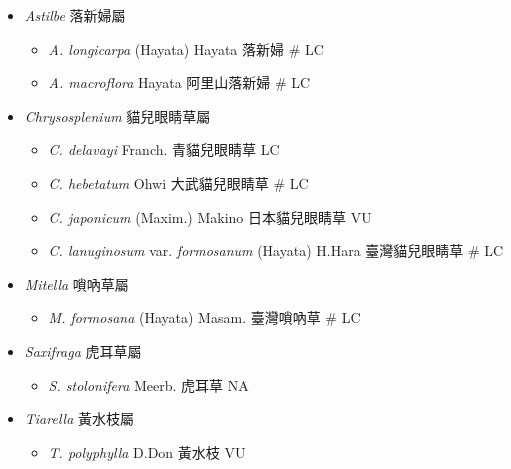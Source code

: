 
  \begin{itemize}
 \item[] \textit{Astilbe} 落新婦屬
                                
  \begin{itemize}
        \item[] \textit{A. longicarpa} (Hayata) Hayata  落新婦  \# LC
        \item[] \textit{A. macroflora} Hayata  阿里山落新婦  \# LC
  \end{itemize}
 \item[] \textit{Chrysosplenium} 貓兒眼睛草屬
                                
  \begin{itemize}
        \item[] \textit{C. delavayi} Franch.  青貓兒眼睛草   LC
        \item[] \textit{C. hebetatum} Ohwi  大武貓兒眼睛草  \# LC
        \item[] \textit{C. japonicum} (Maxim.) Makino  日本貓兒眼睛草   VU
        \item[] \textit{C. lanuginosum} var. \textit{formosanum} (Hayata) H.Hara  臺灣貓兒眼睛草  \# LC
  \end{itemize}
 \item[] \textit{Mitella} 嗩吶草屬
                                
  \begin{itemize}
        \item[] \textit{M. formosana} (Hayata) Masam.  臺灣嗩吶草  \# LC
  \end{itemize}
 \item[] \textit{Saxifraga} 虎耳草屬
                                
  \begin{itemize}
        \item[] \textit{S. stolonifera} Meerb.  虎耳草   NA
  \end{itemize}
 \item[] \textit{Tiarella} 黃水枝屬
                                
  \begin{itemize}
        \item[] \textit{T. polyphylla} D.Don  黃水枝   VU
  \end{itemize}
  \end{itemize}
